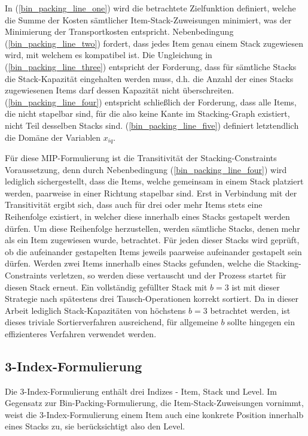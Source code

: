 In (\ref{bin_packing_line_one}) wird die betrachtete Zielfunktion definiert, welche die Summe der Kosten sämtlicher
Item-Stack-Zuweisungen minimiert, was der Minimierung der Transportkosten entspricht.
Nebenbedingung (\ref{bin_packing_line_two}) fordert, dass jedes Item genau einem Stack zugewiesen wird, mit welchem es kompatibel ist.
Die Ungleichung in (\ref{bin_packing_line_three}) entspricht der Forderung, dass für sämtliche Stacks die Stack-Kapazität eingehalten werden muss, d.h.
die Anzahl der eines Stacks zugewiesenen Items darf dessen Kapazität nicht überschreiten. (\ref{bin_packing_line_four}) entspricht schließlich der Forderung, dass alle Items, die nicht stapelbar sind, für die also keine Kante im Stacking-Graph existiert, nicht Teil desselben Stacks sind. (\ref{bin_packing_line_five}) definiert letztendlich die Domäne der Variablen $x_{iq}$.

Für diese MIP-Formulierung ist die Transitivität der Stacking-Constraints Voraussetzung, denn durch Nebenbedingung (\ref{bin_packing_line_four}) wird lediglich sichergestellt, dass die Items, welche gemeinsam in einem Stack platziert werden,
paarweise in einer Richtung stapelbar sind. Erst in Verbindung mit der Transitivität ergibt sich, dass auch für drei oder
mehr Items stets eine Reihenfolge existiert, in welcher diese innerhalb eines Stacks gestapelt werden dürfen.
Um diese Reihenfolge herzustellen, werden sämtliche Stacks, denen mehr als ein Item zugewiesen wurde, betrachtet. Für jeden
dieser Stacks wird geprüft, ob die aufeinander gestapelten Items jeweils paarweise aufeinander gestapelt sein dürfen.
Werden zwei Items innerhalb eines Stacks gefunden, welche die Stacking-Constraints verletzen, so werden diese
vertauscht und der Prozess startet für diesen Stack erneut. Ein vollständig gefüllter Stack mit $b = 3$ ist mit dieser
Strategie nach spätestens drei Tausch-Operationen korrekt sortiert. Da in dieser Arbeit lediglich Stack-Kapazitäten
von höchstens $b = 3$ betrachtet werden, ist dieses triviale Sortierverfahren ausreichend, für allgemeine $b$ sollte
hingegen ein effizienteres Verfahren verwendet werden.

\subsection{3-Index-Formulierung}
\label{sec:three_idx_formulation}

Die 3-Index-Formulierung enthält drei Indizes - Item, Stack und Level.
Im Gegensatz zur Bin-Packing-Formulierung, die Item-Stack-Zuweisungen vornimmt, weist die 3-Index-Formulierung einem
Item auch eine konkrete Position innerhalb eines Stacks zu, sie berücksichtigt also den Level.

